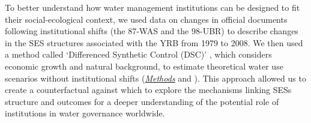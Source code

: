 To better understand how water management institutions can be designed to fit their social-ecological context, we used data on changes in official documents following institutional shifts (the 87-WAS and the 98-UBR) to describe changes in the SES structures associated with the YRB from 1979 to 2008.
We then used a method called `Differenced Synthetic Control (DSC)' \cite{arkhangelsky2021}, which considers economic growth and natural background, to estimate theoretical water use scenarios without institutional shifts (\textit{\hyperref[{sec:methods}]{Methods}} and \textit{}).
This approach allowed us to create a counterfactual against which to explore the mechanisms linking SESs structure and outcomes for a deeper understanding of the potential role of institutions in water governance worldwide.

